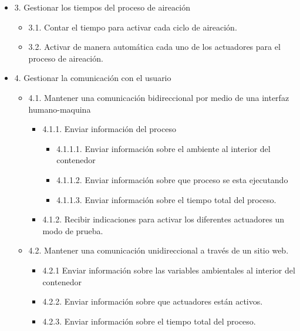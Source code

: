 \begin{itemize}
\begin{itemize}
\begin{itemize}
            \item 2.2.3 En caso de una temperatura superior, encender los actuadores necesarios para disminuir la temperatura
            \item 2.2.4 Conservar una temperatura constante al interior del contenedor.
            \begin{itemize}
                \item 2.2.4.1 Reducir las pérdidas de calor.
                \item 2.2.4.2 Contar con un cierre firme para evitar las fugas de materia orgánica.
            \end{itemize}
        \end{itemize}
    \end{itemize}
    \item 3. Gestionar los tiempos del proceso de aireación
    \begin{itemize}
        \item 3.1. Contar el tiempo para activar cada ciclo de aireación.
        \item 3.2. Activar de manera automática cada uno de los actuadores para el proceso de aireación.
    \end{itemize}
    \item 4. Gestionar la comunicación con el usuario
    \begin{itemize}
        \item 4.1. Mantener una comunicación bidireccional por medio de una interfaz humano-maquina
        \begin{itemize}
            \item 4.1.1. Enviar información del proceso
            \begin{itemize}
                \item 4.1.1.1. Enviar información sobre el ambiente al interior del contenedor
                \item 4.1.1.2. Enviar información sobre que proceso se esta ejecutando
                \item 4.1.1.3. Enviar información sobre el tiempo total del proceso.
            \end{itemize}
            \item 4.1.2. Recibir indicaciones para activar los diferentes actuadores un modo de prueba.
        \end{itemize}
        \item 4.2. Mantener una comunicación unidireccional a través de un sitio web.
        \begin{itemize}
            \item 4.2.1 Enviar información sobre las variables ambientales al interior del contenedor
            \item 4.2.2. Enviar información sobre que actuadores están activos.
            \item 4.2.3. Enviar información sobre el tiempo total del proceso.
        \end{itemize}
    \end{itemize}
\end{itemize}

